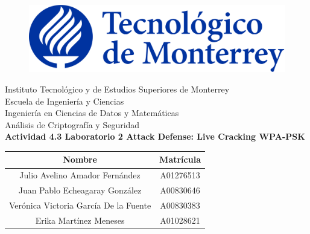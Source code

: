 \documentclass{article}
\begin{document}
    \begin{titlepage}
        \begin{center}
            \begin{figure}
                \centering
                \includegraphics[scale=0.13]{../../img/logo_itesm.png}\\ %
            \end{figure}
            \vspace{5cm}
            \LARGE{Instituto Tecnológico y de Estudios Superiores de Monterrey}\\
            \vspace{1cm}
            \large Escuela de Ingeniería y Ciencias \\
            \vspace{0.2cm}
            \large Ingeniería en Ciencias de Datos y Matemáticas \\
            \vspace{0.2cm}
            \large Análisis de Criptografía y Seguridad\\
            \vspace{1cm}
            \textbf{Actividad 4.3 Laboratorio 2 Attack Defense: Live Cracking WPA-PSK}\\ %
            \vspace{0.7cm}
            \begin{table}[h!]
                \centering
                \begin{tabular}{ ||c|c|| }
                    \hline
                    Nombre & Matrícula \\
                    \hline
                    Julio Avelino Amador Fernández & A01276513 \\
                    \hline
                    Juan Pablo Echeagaray González & A00830646 \\
                    \hline
                    Verónica Victoria García De la Fuente & A00830383 \\
                    \hline
                    Erika Martínez Meneses & A01028621 \\

\end{tabular}
\end{table}
\end{center}
\end{titlepage}
\end{document}
